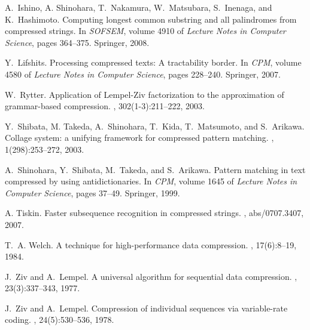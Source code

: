 ﻿\documentclass[10pt, conference, compsocconf]{IEEEtran}
\begin{document}
\begin{thebibliography}{1}
A.~Ishino, A. Shinohara, T.~Nakamura, W.~Matsubara, S.~Inenaga, and
K.~Hashimoto.
\newblock Computing longest common substring and all palindromes from
  compressed strings.
\newblock In {\em SOFSEM}, volume 4910 of {\em Lecture Notes in Computer
  Science}, pages 364--375. Springer, 2008.

Y.~Lifshits.
\newblock Processing compressed texts: A tractability border.
\newblock In {\em CPM}, volume 4580 of {\em Lecture Notes in Computer Science},
  pages 228--240. Springer, 2007.

W.~Rytter.
\newblock Application of Lempel-Ziv factorization to the approximation of
  grammar-based compression.
, 302(1-3):211--222, 2003.

Y.~Shibata, M. Takeda, A.~Shinohara, T.~Kida, T.~Matsumoto, and S.~Arikawa.
\newblock Collage system: a unifying framework for compressed pattern matching.
, 1(298):253--272, 2003.

A.~Shinohara, Y.~Shibata, M.~Takeda, and S.~Arikawa.
\newblock Pattern matching in text compressed by using antidictionaries.
\newblock In {\em CPM}, volume 1645 of {\em Lecture Notes in Computer Science},
  pages 37--49. Springer, 1999.

A. Tiskin.
\newblock Faster subsequence recognition in compressed strings.
, abs/0707.3407, 2007.

T.~A. Welch.
\newblock A technique for high-performance data compression.
, 17(6):8--19, 1984.

J.~Ziv and A.~Lempel.
\newblock A universal algorithm for sequential data compression.
, 23(3):337--343, 1977.

J.~Ziv and A.~Lempel.
\newblock Compression of individual sequences via variable-rate coding.
, 24(5):530--536, 1978.
\end{thebibliography}
\end{document}
